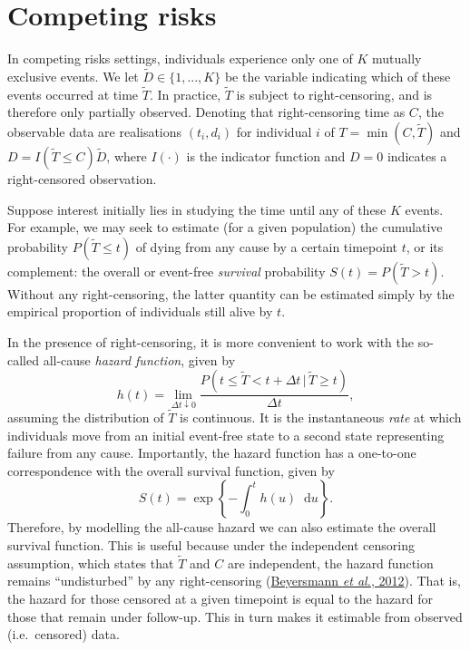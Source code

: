 \documentclass[
  letterpaper,
  DIV=11,
  numbers=noendperiod]{scrreprt}
\newcommand{\given}{\,|\,}
\newcommand\diff{\mathop{}\!\mathrm{d}}
\begin{document}
\hypertarget{sec-intro-comp-risks}{%
\section{Competing risks}\label{sec-intro-comp-risks}}

In competing risks settings, individuals experience only one of \(K\)
mutually exclusive events. We let \(\tilde{D} \in \{1,...,K\}\) be the
variable indicating which of these events occurred at time
\(\tilde{T}\). In practice, \(\tilde{T}\) is subject to right-censoring,
and is therefore only partially observed. Denoting that right-censoring
time as \(C\), the observable data are realisations \((t_i, d_i)\) for
individual \(i\) of \(T = \min(C,\tilde{T})\) and
\(D = I(\tilde{T} \leq C)\tilde{D}\), where \(I(\cdot)\) is the
indicator function and \(D = 0\) indicates a right-censored observation.

Suppose interest initially lies in studying the time until any of these
\(K\) events. For example, we may seek to estimate (for a given
population) the cumulative probability \(P(\tilde{T} \leq t)\) of dying
from any cause by a certain timepoint \(t\), or its complement: the
overall or event-free \emph{survival} probability
\(S(t) = P(\tilde{T} > t)\). Without any right-censoring, the latter
quantity can be estimated simply by the empirical proportion of
individuals still alive by \(t\).

In the presence of right-censoring, it is more convenient to work with
the so-called all-cause \emph{hazard function}, given by \[
    h(t) = \lim_{\Delta t \downarrow 0} \frac{P(t \leq \tilde{T} < t + \Delta t\given \tilde{T} \geq t)}{\Delta t},
\] assuming the distribution of \(\tilde{T}\) is continuous. It is the
instantaneous \emph{rate} at which individuals move from an initial
event-free state to a second state representing failure from any cause.
Importantly, the hazard function has a one-to-one correspondence with
the overall survival function, given by \[
  S(t) = \exp \left\{ - \int_{0}^{t} h(u)\diff u \right\}.
\] Therefore, by modelling the all-cause hazard we can also estimate the
overall survival function. This is useful because under the independent
censoring assumption, which states that \(\tilde{T}\) and \(C\) are
independent, the hazard function remains ``undisturbed'' by any
right-censoring
(\protect\hyperlink{ref-beyersmannCompetingRisksMultistate2012}{Beyersmann
\emph{et al.}, 2012}). That is, the hazard for those censored at a given
timepoint is equal to the hazard for those that remain under follow-up.
This in turn makes it estimable from observed (i.e.~censored) data.
\end{document}
